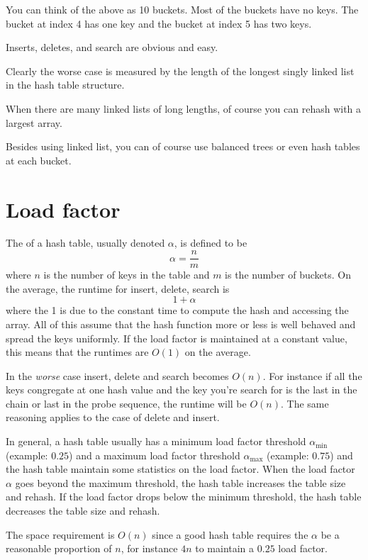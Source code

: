 You can think of the above as 10 buckets.
Most of the buckets have no keys.
The bucket at index 4 has one key
and the bucket at index 5 has two keys.

Inserts, deletes, and search are obvious and easy.

Clearly the worse case is measured by the length of the longest singly
linked list in the hash table structure.

When there are many linked lists of long lengths,
of course you can rehash with a largest array.

Besides using linked list, you can of course use balanced trees or even
hash tables at each bucket.



\newpage
\section{Load factor}

The  of a hash table, usually denoted $\alpha$, 
is defined to be
\[
\alpha = \frac{n}{m}
\]
where $n$ is the number of keys in the table and $m$ is the number of buckets.
On the average, the runtime for insert, delete, search is
\[
1 + \alpha
\]
where the 1 is due to the constant time to compute the hash and accessing the array.
All of this assume that the hash function more or less is well behaved and spread
the keys uniformly.
If the load factor is maintained at a constant value, this means
that the runtimes are $O(1)$ on the average.

In the \textit{worse} case 
insert, delete and search becomes $O(n)$.
For instance if all the keys congregate at one hash value and the 
key you're search for is the last in the chain or last in the probe sequence,
the runtime will be $O(n)$.
The same reasoning applies to the case of delete and insert.

In general, a hash table usually has a minimum load factor threshold
$\alpha_{\operatorname{min}}$ (example: $0.25$)
and a maximum load factor threshold
$\alpha_{\operatorname{max}}$ (example: $0.75$)
and the hash table maintain some statistics on the load factor.
When the load factor $\alpha$ goes beyond the maximum threshold, 
the hash table increases the table size and rehash.
If the load factor drops below the minimum threshold, the hash table
decreases the table size and rehash.

The space requirement is $O(n)$ since 
a good hash table requires the $\alpha$ be a reasonable
proportion of $n$, for instance $4n$ to maintain a $0.25$ load factor.



